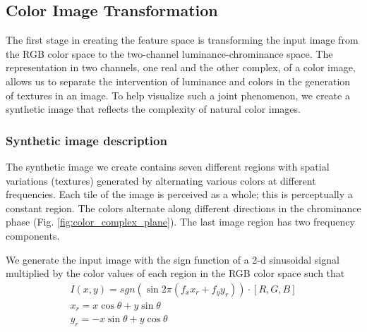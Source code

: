 \subsection{Color Image Transformation}
The first stage in creating the feature space is transforming the input image from the RGB color space to the two-channel luminance-chrominance space. The representation in two channels, one real and the other complex, of a color image, allows us to separate the intervention of luminance and colors in the generation of textures in an image. To help visualize such a joint phenomenon, we create a synthetic image that reflects the complexity of natural color images.

\subsubsection{Synthetic image description}
The synthetic image we create contains seven different regions with spatial variations (textures) generated by alternating various colors at different frequencies. Each tile of the image is perceived as a whole; this is perceptually a constant region. The colors alternate along different directions in the chrominance phase (Fig. \ref{fig:color_complex_plane}). The last image region has two frequency components.

We generate the input image with the sign function of a 2-d sinusoidal signal multiplied by the color values of each region in the RGB color space such that
\begin{gather}
	I(x, y) = sgn( \sin 2 \pi (f_x x_r + f_y y_r)) \cdot [R, G, B]\label{eq:2D_squared_signal}\\
	x_r = x \cos\theta + y \sin\theta \nonumber \\
    y_r = -x \sin\theta + y \cos\theta \nonumber  
\end{gather}

